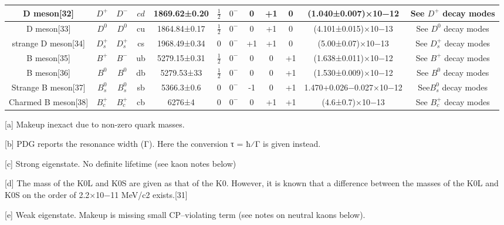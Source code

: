 \begin{table}[ht]
\begin{tabular}{|c|c|c|c|c|c|c|c|c|c|c|c|}
\hline
D meson[32] & $D^+$ & $D^-$ & $cd$ & 1869.62±0.20& $\frac{1}{2}$ & $0^-$ & 0   & +1 & 0 &(1.040±0.007)×10−12&See $D^+$ decay modes \\
\hline
D meson[33] & $D^0$ & $D^0$ & cu & 1864.84±0.17 & $\frac{1}{2}$ & $0^-$ &0 & +1 & 0 & (4.101±0.015)×10−13 & See $D^0$ decay modes \\
\hline
strange D meson[34] &$D^+_s$ &$D^+_s$   & cs& 1968.49±0.34	& 0 & $0^-$ & +1 & +1 & 0 & (5.00±0.07)×10−13 & See $D^+_s$ decay modes \\
\hline
B meson[35] & $B^+$ & $B^-$ & ub & 5279.15±0.31 & $\frac{1}{2}$ & $0^-$ & 0 & 0 & +1 & (1.638±0.011)×10−12 & See $B^+$ decay modes\\
\hline
B meson[36] & $B^0$ & $B^0$ &db & 5279.53±33 & $\frac{1}{2}$ & $0^-$ & 0 & 0 & +1 & (1.530±0.009)×10−12 & See $B^0$ decay modes \\
\hline
Strange B meson[37] & $B^0_s$ &  $B^0_s$& sb & 5366.3±0.6 & 0 & $0^-$ & -1 & 0 & +1 & 1.470+0.026−0.027×10−12 & See$ B^0_s$ decay modes \\
\hline
Charmed B meson[38] & $B^+_c$ & $B^+_c$ & cb & 6276±4 & 0 & $0^-$ & 0 & +1 & +1 & (4.6±0.7)×10−13 & See $B^+_c$ decay modes \\
\hline
\end{tabular}
\end{table}

[a] Makeup inexact due to non-zero quark masses.

[b] PDG reports the resonance width (Γ). Here the conversion τ = ħ⁄Γ is given instead.

[c] Strong eigenstate. No definite lifetime (see kaon notes below)

[d] The mass of the K0L and K0S are given as that of the K0. However, it is known that a difference between the masses of the K0L and K0S on the order of 2.2×10−11 MeV/c2 exists.[31]

[e] Weak eigenstate. Makeup is missing small CP–violating term (see notes on neutral kaons below).
